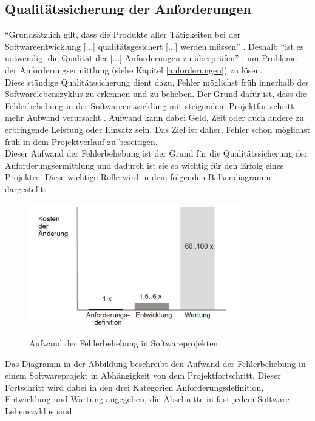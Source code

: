 \documentclass [12pt, a4paper, oneside, titlepage, ngerman]{article}
\begin{document}
\subsection{Qualitätssicherung der Anforderungen}
"`Grundsätzlich gilt, dass die Produkte aller Tätigkeiten bei der Softwareentwicklung [...] qualitätsgesichert [...] werden müssen"' \cite[S.55]{Winter1999}. Deshalb "`ist es notwendig, die Qualität der [...] Anforderungen zu überprüfen"' \cite[S.95]{PohlRupp2015}, um Probleme der Anforderungsermittlung (siehe Kapitel \ref{anforderungen}) zu lösen.  \\
Diese ständige Qualitätssicherung dient dazu, Fehler möglichst früh innerhalb des Softwarelebenszyklus zu erkennen und zu beheben. Der Grund dafür ist, dass die Fehlerbehebung in der Softwareentwicklung mit steigendem Projektfortschritt mehr Aufwand verursacht \cite[vgl.][S.2]{hussmann}. Aufwand kann dabei Geld, Zeit oder auch andere zu erbringende Leistung oder Einsatz sein. Das Ziel ist daher, Fehler schon möglichst früh in dem Projektverlauf zu beseitigen. \\

\noindent Dieser Aufwand der Fehlerbehebung ist der Grund für die Qualitätssicherung der Anforderungsermittlung und dadurch ist sie so wichtig für den Erfolg eines Projektes. Diese wichtige Rolle wird in dem folgenden Balkendiagramm dargestellt:
\begin{figure}[H]
	\hspace{-2cm}
	\centering
	\includegraphics[width=350px,keepaspectratio]{TUDresden.png}
	\caption{Aufwand der Fehlerbehebung in Softwareprojekten}
	\cite[S.2]{hussmann}
	\label{img:TUDresden}
\end{figure}
\noindent Das Diagramm in der Abbildung beschreibt den Aufwand der Fehlerbehebung in einem Softwareprojekt in Abhängigkeit von dem Projektfortschritt. Dieser Fortschritt wird dabei in den drei Kategorien Anforderungsdefinition, Entwicklung und Wartung angegeben, die Abschnitte in fast jedem Software-Lebenszyklus sind. \\
\end{document}
